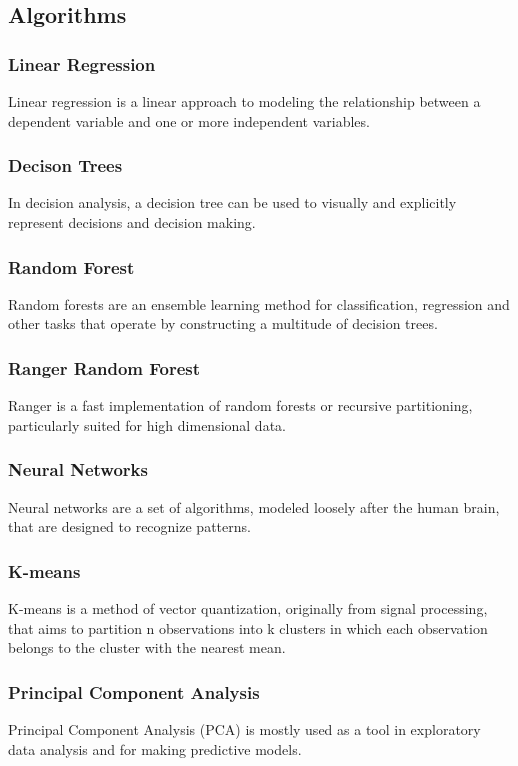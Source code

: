 \documentclass{FR16}
\begin{document}
\subsection{Algorithms}
\subsubsection{Linear Regression}
 Linear regression  is a linear approach to modeling the relationship between a dependent variable and one or more independent variables. 
 
  \subsubsection{Decison Trees}
In decision analysis, a decision tree can be used to visually and explicitly represent decisions and decision making.

 \subsubsection{Random Forest}
 Random forests are an ensemble learning method for classification, regression and other tasks that operate by constructing a multitude of decision trees.
 \subsubsection{Ranger Random Forest}
Ranger is a fast implementation of random forests or recursive partitioning, particularly suited for high dimensional data. 

\subsubsection{Neural Networks}
Neural networks are a set of algorithms, modeled loosely after the human brain, that are designed to recognize patterns.

\subsubsection{K-means}
K-means is a method of vector quantization, originally from signal processing, that aims to partition n observations into k clusters in which each observation belongs to the cluster with the nearest mean.

\subsubsection{Principal Component Analysis}
Principal Component Analysis (PCA) is mostly used as a tool in exploratory data analysis and for making predictive models.
\end{document}
